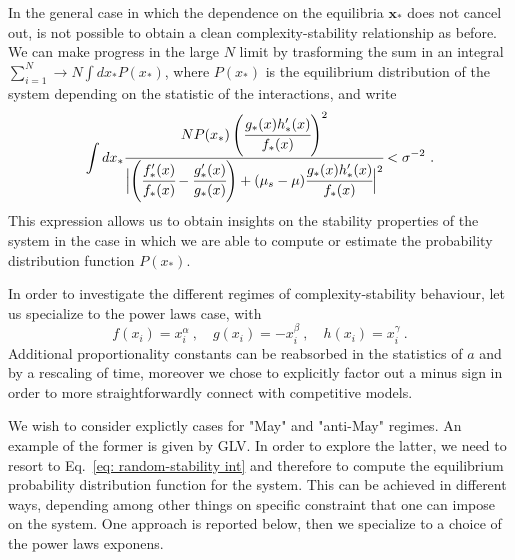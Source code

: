 \documentclass[%
 reprint,
 amsmath,amssymb,
 aps,
]{revtex4-2}
\begin{document}
In the general case in which the dependence on the equilibria
$\mathbf{x}_*$ does not cancel out, is not possible to
obtain a clean complexity-stability relationship as before.
We can make progress in the large $N$ limit by
trasforming the sum in an integral 
$\sum_{i=1}^N\to N\int dx_*P(x_*)$, where $P(x_*)$ 
is the equilibrium distribution of the system
depending on the statistic of the interactions,
and write
\begin{equation}\label{eq: random-stability int}
    \int dx_* \cfrac{NP(x_*) \left(\cfrac{g_*(x)h_*'(x)}{f_*(x)}\right)^2}{
        \Bigl |\left(\cfrac{f_*'(x)}{f_*(x)} -
        \cfrac{g_*'(x)}{g_*(x)}\right)
        +(\mu_s-\mu) \cfrac{g_*(x)h_*'(x)}{f_*(x)} \Bigl |^2}
    < \sigma^{-2} \ .
\end{equation}
This expression allows us to obtain insights on the stability properties of
the system in the case in which we are able to compute or estimate 
the probability distribution function $P(x_*)$.

In order to investigate the different regimes
of complexity-stability behaviour,
let us specialize to the power laws case, with 
\begin{equation}
    f(x_i)=x_i^{\alpha} \ , \quad g(x_i)=-x_i^{\beta} \ , \quad h(x_i)=x_i^{\gamma} \ .
\end{equation} 
Additional proportionality constants can be reabsorbed in the statistics
of $a$ and by a rescaling of time, moreover we chose to explicitly
factor out a minus sign in order to more straightforwardly connect
with competitive models.

We wish to consider explictly cases
for "May" and "anti-May" regimes.
An example of the former is given by GLV.
In order to explore the latter, we 
need to resort to Eq.~\eqref{eq: random-stability int} and therefore
to compute the equilibrium probability distribution function
for the system. This can be achieved in different ways,
depending among other things on specific constraint that
one can impose on the system. 
One approach is reported below, then we specialize to a choice of
the power laws exponens.
\end{document}
